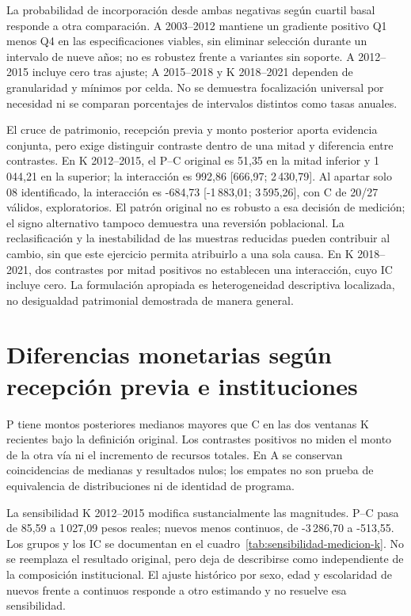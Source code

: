 La probabilidad de incorporación desde ambas negativas según cuartil basal
responde a otra comparación. A 2003--2012 mantiene un gradiente positivo
Q1 menos Q4 en las especificaciones viables, sin eliminar selección durante
un intervalo de nueve años; no es robustez frente a variantes sin soporte.
A 2012--2015 incluye cero tras ajuste; A 2015--2018 y K 2018--2021 dependen
de granularidad y mínimos por celda. No se demuestra focalización universal
por necesidad ni se comparan porcentajes de intervalos distintos como tasas
anuales.

El cruce de patrimonio, recepción previa y monto posterior aporta evidencia
conjunta, pero exige distinguir contraste dentro de una mitad y diferencia
entre contrastes. En K 2012--2015, el P--C original es 51{,}35 en la mitad
inferior y 1\,044{,}21 en la superior; la interacción es 992{,}86
[666{,}97; 2\,430{,}79]. Al apartar solo 08 identificado, la interacción es
-684{,}73 [-1\,883{,}01; 3\,595{,}26], con C de 20/27 válidos,
exploratorios. El patrón original no es robusto a esa decisión de medición;
el signo alternativo tampoco demuestra una reversión poblacional. La
reclasificación y la inestabilidad de las muestras reducidas pueden
contribuir al cambio, sin que este ejercicio permita atribuirlo a una sola
causa. En K
2018--2021, dos contrastes por mitad positivos no establecen una interacción,
cuyo IC incluye cero. La formulación apropiada es heterogeneidad descriptiva
localizada, no desigualdad patrimonial demostrada de manera general.

\section{Diferencias monetarias según recepción previa e instituciones}

P tiene montos posteriores medianos mayores que C en las dos ventanas K
recientes bajo la definición original. Los contrastes positivos no miden
el monto de la otra vía ni el incremento de recursos totales. En A se
conservan coincidencias de medianas y resultados nulos; los empates no son
prueba de equivalencia de distribuciones ni de identidad de programa.

La sensibilidad K 2012--2015 modifica sustancialmente las magnitudes.
P--C pasa de 85{,}59 a 1\,027{,}09 pesos reales; nuevos menos continuos, de
-3\,286{,}70 a -513{,}55. Los grupos y los IC se documentan en el
cuadro~\ref{tab:sensibilidad-medicion-k}. No se reemplaza el resultado
original, pero deja de describirse como independiente de la composición
institucional. El ajuste histórico por sexo, edad y escolaridad de nuevos
frente a continuos responde a otro estimando y no resuelve esa sensibilidad.


